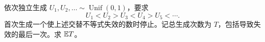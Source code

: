 依次独立生成 $U_1,U_2,\ldots\sim\operatorname{Unif}(0,1)$，要求
\[
U_1<U_2>U_3<U_4>U_5<\cdots.
\]
首次生成一个使上述交替不等式失效的数时停止。记总生成次数为 $T$，包括导致失效的最后一次。求 $\mathbb{E} T$。
